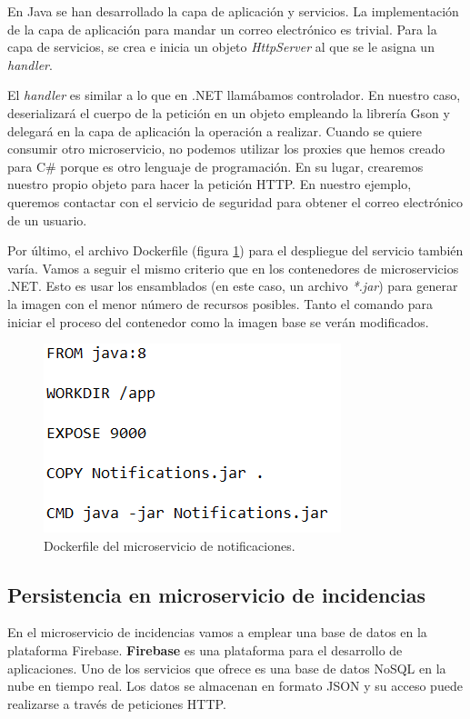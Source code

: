 \documentclass[11pt,spanish,listoffigures]{tfgetsinf}
\begin{document}
En Java se han desarrollado la capa de aplicación y servicios. La implementación de la capa de aplicación para mandar un correo electrónico es trivial. Para la capa de servicios, se crea e inicia un objeto \textit{HttpServer} al que se le asigna un \textit{handler}.

El \textit{handler} es similar a lo que en .NET llamábamos controlador. En nuestro caso, deserializará el cuerpo de la petición en un objeto empleando la librería Gson y delegará en la capa de aplicación la operación a realizar. Cuando se quiere consumir otro microservicio, no podemos utilizar los proxies que hemos creado para C\# porque es otro lenguaje de programación. En su lugar, crearemos nuestro propio objeto para hacer la petición HTTP. En nuestro ejemplo, queremos contactar con el servicio de seguridad para obtener el correo electrónico de un usuario.

Por último, el archivo Dockerfile (figura \ref{fig:JavaDockerfile}) para el despliegue del servicio también varía. Vamos a seguir el mismo criterio que en los contenedores de microservicios .NET. Esto es usar los ensamblados (en este caso, un archivo \textit{*.jar}) para generar la imagen con el menor número de recursos posibles. Tanto el comando para iniciar el proceso del contenedor como la imagen base se verán modificados.

\begin{figure}[h]
\centering
\includegraphics[scale=1]{JavaDockerfile}
\caption{Dockerfile del microservicio de notificaciones.}
\label{fig:JavaDockerfile}
\end{figure}

\subsection{Persistencia en microservicio de incidencias}

En el microservicio de incidencias vamos a emplear una base de datos en la plataforma Firebase. \textbf{Firebase} es una plataforma para el desarrollo de aplicaciones. Uno de los servicios que ofrece es una base de datos NoSQL en la nube en tiempo real. Los datos se almacenan en formato JSON y su acceso puede realizarse a través de peticiones HTTP.
\end{document}
